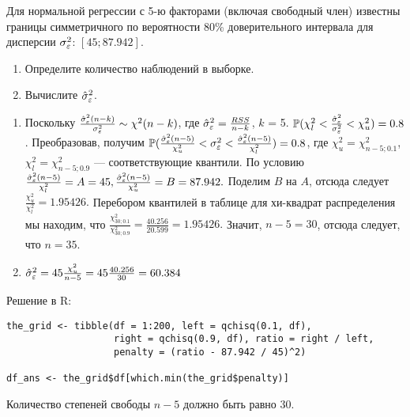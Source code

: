 \begin{problem}  %
 Для нормальной регрессии с 5-ю факторами (включая свободный член) известны границы симметричного по вероятности 80\% доверительного интервала для дисперсии $\sigma_{\varepsilon}^2$: $[45; 87.942]$.

\begin{enumerate}
\item Определите количество наблюдений в выборке.
\item Вычислите $\hat{\sigma}_{\varepsilon}^2$.
\end{enumerate}


\begin{sol}
\begin{enumerate}
\item Поскольку $\frac{\hat{\sigma}_{\varepsilon}^2(n-k)}{\sigma_{\varepsilon}^2} \sim \chi ^2(n-k)$, где $\hat{\sigma}_{\varepsilon}^2 = \frac{RSS}{n-k}$, $k$ = 5. $\mathbb{P}(\chi_{l}^2 < \frac{\hat{\sigma}_{\varepsilon}^2}{\sigma_{\varepsilon}^2} < \chi_{u}^2) = 0.8$. Преобразовав, получим $\mathbb{P}(\frac{\hat{\sigma}_{\varepsilon}^2(n-5)}{\chi_{u}^2} < \sigma_{\varepsilon}^2 < \frac{\hat{\sigma}_{\varepsilon}^2(n-5)}{\chi_{l}^2}) = 0.8$, где $\chi_{u}^2 = \chi_{n-5; 0.1} ^2$, $\chi_{l}^2 = \chi_{n-5; 0.9} ^2$ — соответствующие квантили. По условию $\frac{\hat{\sigma}_{\varepsilon}^2(n-5)}{\chi_{l}^2} = A = 45, \frac{\hat{\sigma}_{\varepsilon}^2(n-5)}{\chi_{u}^2} = B = 87.942.$ Поделим $B$ на $A$, отсюда следует $\frac{\chi_{u}^2}{\chi_{l}^2} = 1.95426.$ Перебором квантилей в таблице для хи-квадрат распределения мы находим, что $\frac{\chi_{30; 0.1}^2}{\chi_{30; 0.9}^2} = \frac{40.256}{20.599} = 1.95426.$ Значит, $n - 5 = 30$, отсюда следует, что $n = 35.$
\item $\hat{\sigma}_{\varepsilon}^2 = 45 \frac{\chi_{u}^2}{n-5} = 45 \frac{40.256}{30} = 60.384$
\end{enumerate}

Решение в R:
\begin{verbatim}
the_grid <- tibble(df = 1:200, left = qchisq(0.1, df),
                   right = qchisq(0.9, df), ratio = right / left,
                   penalty = (ratio - 87.942 / 45)^2)

df_ans <- the_grid$df[which.min(the_grid$penalty)]
\end{verbatim}

Количество степеней свободы $n-5$ должно быть равно $30$.

\end{sol}
\end{problem}


